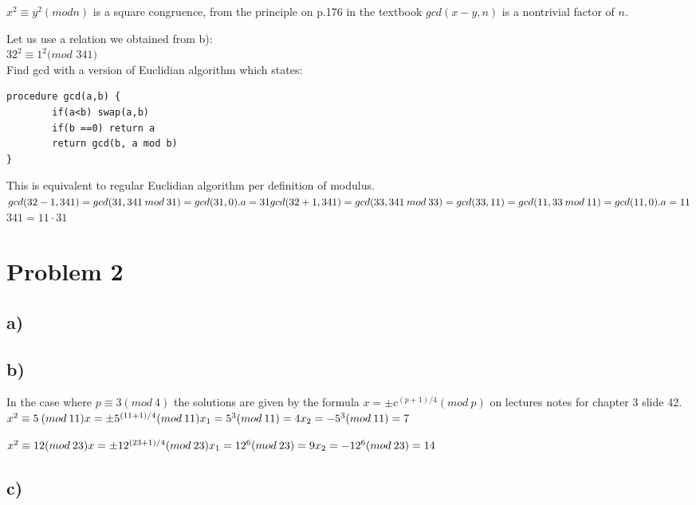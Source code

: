 \documentclass{article}
\begin{document}
$x^{2} \equiv y^{2} (mod n)$ is a square congruence, from the principle on p.176 in the textbook $gcd(x-y,n)$ is a nontrivial factor of $n$.

Let us use a relation we obtained from b):\\
$32^{2} \equiv 1^{2} (mod$ $341)$\\
Find gcd with a version of Euclidian algorithm which states: 
\begin{verbatim}
procedure gcd(a,b) {
		if(a<b) swap(a,b)
		if(b ==0) return a
		return gcd(b, a mod b)
}
\end{verbatim}
This is equivalent to regular Euclidian algorithm per definition of modulus.
$
gcd(32-1, 341) = gcd(31, 341 \: mod \: 31) =  gcd(31,0). a = 31\\
gcd(32+1, 341) = gcd(33, 341 \: mod \: 33) =  gcd(33,11) = gcd(11, 33 \: mod \: 11) = gcd(11,0). a = 11\\
$
$341 = 11 \cdotp 31$

\section*{Problem 2}

\subsection*{a)}


\subsection*{b)}

In the case where $p \equiv 3(mod \: 4)$ the solutions are given by the formula $x = \pm c^{(p+1)/4} (mod\:p)$ on lectures notes for chapter 3 slide 42.\\
$
x^{2} \equiv 5\:(mod \: 11)\\
x = \pm 5^{(11+1)/4}(mod \: 11)\\
x_{1} = 5^{3}(mod \: 11) = 4\\
x_{2} = -5^{3}(mod \: 11) = 7
$

$
x^{2} \equiv 12(mod \: 23)\\
x = \pm 12^{(23+1)/4}(mod \: 23)\\
x_{1} = 12^{6}(mod \: 23) = 9\\
x_{2} = -12^{6}(mod \: 23) = 14
$

\subsection*{c)}
\end{document}
